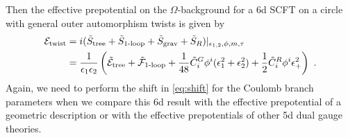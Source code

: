 Then the effective prepotential on the $\Omega$-background for a 6d SCFT on a circle with general outer automorphism twists is given by
\begin{align}\label{eq:E-twist}
\mathcal{E}_{{\rm twist}} &= i(\tilde{S}_{\rm tree} + \tilde{S}_{\text{1-loop}} + \tilde{S}_{\rm grav} + \tilde{S}_R) |_{\epsilon_{1,2},\phi,m,\tau} \nonumber \\
	&= \frac{1}{\epsilon_1\epsilon_2}\left(\tilde{\mathcal{E}}_{\rm tree}+\tilde{\mathcal{F}}_{\text{1-loop}}+\frac{1}{48} \tilde{C}^G_i\phi^i (\epsilon_1^2+\epsilon_2^2) + \frac{1}{2}\tilde{C}_i^R \phi^i\epsilon_+^2\right) \ .
\end{align}
Again, we need to perform the shift in \eqref{eq:shift} for the Coulomb branch parameters when we compare this 6d result with the effective prepotential of a geometric description or with the effective prepotentials of other 5d dual gauge theories. 

